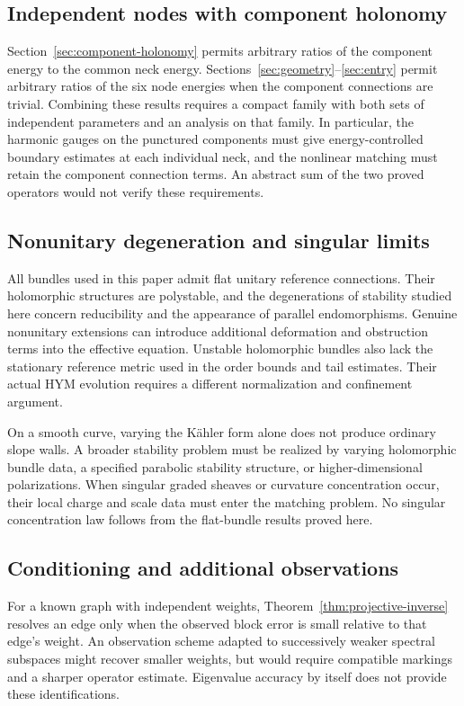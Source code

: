 \subsection{Independent nodes with component holonomy}
Section~\ref{sec:component-holonomy} permits arbitrary
ratios of the component energy to the common neck
energy. Sections~\ref{sec:geometry}--\ref{sec:entry}
permit arbitrary ratios of the six node energies
when the component connections are trivial.
Combining these results requires a compact family
with both sets of independent parameters and an
analysis on that family. In particular, the
harmonic gauges on the punctured components must
give energy-controlled boundary estimates at each
individual neck, and the nonlinear matching must
retain the component connection terms. An abstract
sum of the two proved operators would not verify
these requirements.

\subsection{Nonunitary degeneration and singular limits}
All bundles used in this paper admit flat unitary
reference connections. Their holomorphic structures
are polystable, and the degenerations of stability
studied here concern reducibility and the
appearance of parallel endomorphisms. Genuine
nonunitary extensions can introduce additional
deformation and obstruction terms into the
effective equation. Unstable holomorphic bundles
also lack the stationary reference metric used
in the order bounds and tail estimates.
Their actual HYM evolution requires a different
normalization and confinement argument.

On a smooth curve, varying the Kähler form alone
does not produce ordinary slope walls. A broader
stability problem must be realized by varying
holomorphic bundle data, a specified parabolic
stability structure, or higher-dimensional
polarizations. When singular graded sheaves or
curvature concentration occur, their local charge
and scale data must enter the matching problem.
No singular concentration law follows from the
flat-bundle results proved here.

\subsection{Conditioning and additional observations}
For a known graph with independent weights,
Theorem~\ref{thm:projective-inverse} resolves an edge
only when the observed block error is small
relative to that edge's weight. An observation
scheme adapted to successively weaker spectral
subspaces might recover smaller weights, but
would require compatible markings and a sharper
operator estimate. Eigenvalue accuracy by itself
does not provide these identifications.

